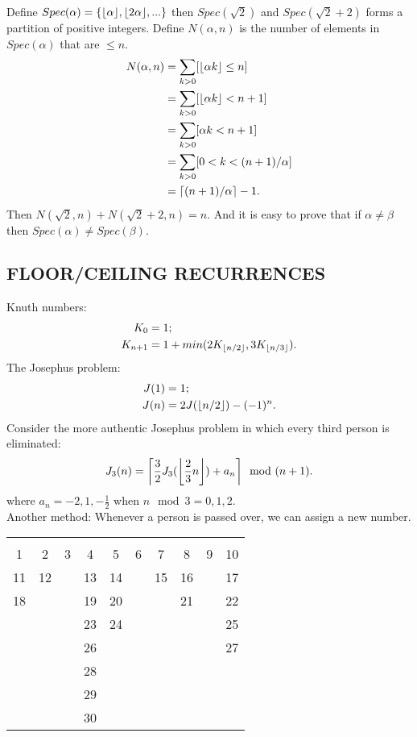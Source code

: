 \documentclass{article}
\DeclarePairedDelimiter\ceil{\lceil}{\rceil}
\DeclarePairedDelimiter\floor{\lfloor}{\rfloor}
\begin{document}
Define $Spec(\alpha) = \{\floor{\alpha}, \floor{2\alpha},...\}$ then $Spec(\sqrt{2})$ and $Spec(\sqrt{2}+2)$ forms a partition of positive integers.
Define $N(\alpha,n)$ is the number of elements in $Spec(\alpha)$ that are $\le n$.
\begin{align}
N(\alpha,n) &= \sum_{k>0}[\floor{\alpha k} \le n] \\
	    &= \sum_{k>0}[\floor{\alpha k} < n + 1] \\
	    &= \sum_{k>0}[\alpha k < n + 1] \\
	    &= \sum_{k>0}[ 0 < k < (n + 1)/\alpha] \\
	    &= \ceil{(n+1)/\alpha} - 1.
\end{align}
Then $N(\sqrt{2}, n) + N(\sqrt{2}+2, n) = n$. 
And it is easy to prove that if $\alpha \neq \beta$ then $Spec(\alpha) \neq Spec(\beta)$.
\subsection{FLOOR/CEILING RECURRENCES}
Knuth numbers:
\begin{align}
K_0 &= 1; \\
K_{n+1} &= 1 + min(2K_{\floor{n/2}}, 3K_{\floor{n/3}}).
\end{align}
The Josephus problem:
\begin{align}
J(1) &= 1; \\
J(n) &=  2J(\floor{n/2}) - (-1)^n.
\end{align}
Consider the more authentic Josephus problem in which every third person is eliminated:
\begin{align}
J_3(n) = \ceil*{\frac{3}{2}J_3(\floor*{\frac{2}{3}n}) + a_n} \mod (n+1).
\end{align}
where $a_n = -2,1,-\frac{1}{2}$ when $n \mod 3 = 0,1,2$.\\
Another method: Whenever a person is passed over, we can assign a new number.
\begin{center}
\begin{tabular}{ c c c c c c c c c c }
 \hline \\
 1 & 2 & 3 & 4 & 5 & 6 & 7 & 8 & 9 & 10 \\ 
 11 & 12 & & 13 & 14 & & 15 & 16 & & 17 \\  
 18 & & & 19 & 20 & & & 21 & & 22 \\
   &   &   & 23 & 24 &  & & & & 25 \\
   &   &   &  26 & &  & & & & 27 \\
   &   &   &  28 & &  & & & &  \\
   &   &   &  29 & &  & & & &  \\
   &   &   &  30 & &  & & & &  \\
\hline
\end{tabular}
\end{center}
\end{document}
